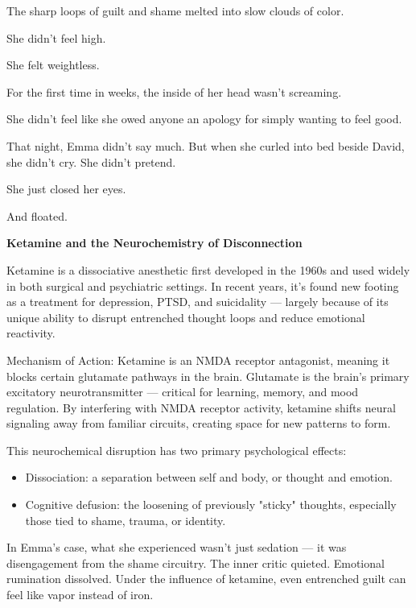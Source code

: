 The sharp loops of guilt and shame melted into slow clouds of color.

She didn’t feel high.

She felt weightless.

For the first time in weeks, the inside of her head wasn’t screaming.

She didn’t feel like she owed anyone an apology for simply wanting to feel good.

That night, Emma didn’t say much. But when she curled into bed beside David, she didn’t cry.
She didn’t pretend.

She just closed her eyes.

And floated.

\begin{TechnicalSidebar}{\textbf{Ketamine and the Neurochemistry of Disconnection}}

  Ketamine is a dissociative anesthetic first developed in the 1960s and used widely in both surgical and 
  psychiatric settings. In recent years, it's found new footing as a treatment for depression, PTSD, and 
  suicidality — largely because of its unique ability to disrupt entrenched thought loops and reduce 
  emotional reactivity.
  
  \medskip
  
  Mechanism of Action:
  Ketamine is an NMDA receptor antagonist, meaning it blocks certain glutamate pathways in the brain. 
  Glutamate is the brain’s primary excitatory neurotransmitter — critical for learning, memory, and mood 
  regulation. By interfering with NMDA receptor activity, ketamine shifts neural signaling away from familiar 
  circuits, creating space for new patterns to form.

  \medskip
  
  This neurochemical disruption has two primary psychological effects:
  
  \begin{itemize}
    \item Dissociation: a separation between self and body, or thought and emotion.
    \item Cognitive defusion: the loosening of previously "sticky" thoughts, especially those tied to shame, 
    trauma, or identity.
  \end{itemize}
  
  \medskip
  
  In Emma’s case, what she experienced wasn’t just sedation — it was disengagement from the shame circuitry. The 
  inner critic quieted. Emotional rumination dissolved. Under the influence of ketamine, even entrenched guilt 
  can feel like vapor instead of iron.
  

\end{TechnicalSidebar}
